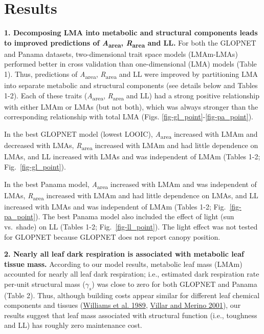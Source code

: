 \documentclass[
  12pt,
  letterpaper,
  DIV=11,
  numbers=noendperiod]{scrartcl}
\begin{document}
\hypertarget{results}{%
\section{Results}\label{results}}

\textbf{1. Decomposing LMA into metabolic and structural components
leads to improved predictions of \emph{A}\textsubscript{area},
\emph{R}\textsubscript{area} and LL.} For both the GLOPNET and Panama
datasets, two-dimensional trait space models (LMAm-LMAs) performed
better in cross validation than one-dimensional (LMA) models (Table 1).
Thus, predictions of \emph{A}\textsubscript{area},
\emph{R}\textsubscript{area} and LL were improved by partitioning LMA
into separate metabolic and structural components (see details below and
Tables 1-2). Each of these traits (\emph{A}\textsubscript{area},
\emph{R}\textsubscript{area} and LL) had a strong positive relationship
with either LMAm or LMAs (but not both), which was always stronger than
the corresponding relationship with total LMA (Figs.
\ref{fig-gl_point}-\ref{fig-pa_point}).

In the best GLOPNET model (lowest LOOIC), \emph{A}\textsubscript{area}
increased with LMAm and decreased with LMAs,
\emph{R}\textsubscript{area} increased with LMAm and had little
dependence on LMAs, and LL increased with LMAs and was independent of
LMAm (Tables 1-2; Fig.~\ref{fig-gl_point}).

In the best Panama model, \emph{A}\textsubscript{area} increased with
LMAm and was independent of LMAs, \emph{R}\textsubscript{area} increased
with LMAm and had little dependence on LMAs, and LL increased with LMAs
and was independent of LMAm (Tables 1-2; Fig.~\ref{fig-pa_point}). The
best Panama model also included the effect of light (sun vs.~shade) on
LL (Tables 1-2; Fig.~\ref{fig-ll_point}). The light effect was not
tested for GLOPNET because GLOPNET does not report canopy position.

\textbf{2. Nearly all leaf dark respiration is associated with metabolic
leaf tissue mass.} According to our model results, metabolic leaf mass
(LMAm) accounted for nearly all leaf dark respiration; i.e., estimated
dark respiration rate per-unit structural mass (\(\gamma_s\)) was close
to zero for both GLOPNET and Panama (Table 2). Thus, although building
costs appear similar for different leaf chemical components and tissues
(\protect\hyperlink{ref-Williams1989}{Williams et al. 1989},
\protect\hyperlink{ref-Villar2001}{Villar and Merino 2001}), our results
suggest that leaf mass associated with structural function (i.e.,
toughness and LL) has roughly zero maintenance cost.
\end{document}
